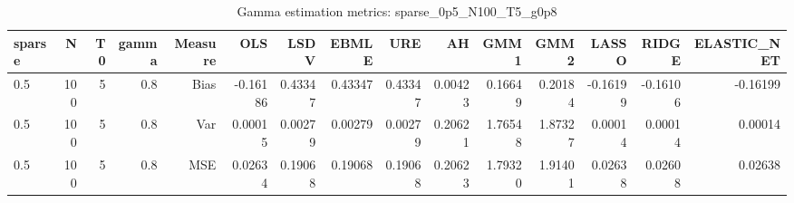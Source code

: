 \begin{table}[!htbp]\centering
\caption{Gamma estimation metrics: sparse_0p5_N100_T5_g0p8}
\label{tab:table1_sparse_0p5_N100_T5_g0p8}
\begin{tabular}{lrrrrrrrrrrrrrr}
\hline
sparse & N & T0 & gamma & Measure & OLS & LSDV & EBMLE & URE & AH & GMM1 & GMM2 & LASSO & RIDGE & ELASTIC_NET \\
\hline
0.5 & 100 & 5 & 0.8 & Bias & -0.16186 & 0.43347 & 0.43347 & 0.43347 & 0.00423 & 0.16649 & 0.20184 & -0.16199 & -0.16106 & -0.16199 \\
0.5 & 100 & 5 & 0.8 & Var & 0.00015 & 0.00279 & 0.00279 & 0.00279 & 0.20621 & 1.76548 & 1.87327 & 0.00014 & 0.00014 & 0.00014 \\
0.5 & 100 & 5 & 0.8 & MSE & 0.02634 & 0.19068 & 0.19068 & 0.19068 & 0.20623 & 1.79320 & 1.91401 & 0.02638 & 0.02608 & 0.02638 \\
\hline
\end{tabular}
\end{table}

